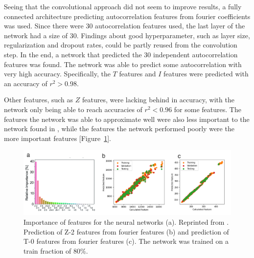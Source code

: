 Seeing that the convolutional approach did not seem to improve results, a fully connected architecture predicting autocorrelation features from fourier coefficients 
was used.
Since there were 30 autocorrelation features used, the last layer of the network had a size of 30.
Findings about good hyperparameter, such as layer size, regularization and dropout rates, could be partly reused from the convolution step.
In the end, a network that predicted the 30 independent autocorrelation features was found.
The network was able to predict some autocorrelation with very high accuracy. Specifically, the $T$ features and $I$ features were
predicted with an accuracy of $r^2 > 0.98$. 

Other features, such as $Z$ features, were lacking behind in accuracy, with the network only being able to reach accuracies of $r^2<0.96$ for some features.
The features the network was able to approximate well were also less important to the network found in \cite{friederich_dos}, while the features 
the network performed poorly were the more important features [Figure~\ref{fig:transfer_result}].

\begin{figure}[h]
    \includegraphics[width=1.0\textwidth]{figures/regression/fourier/transfer/transfer-learn.png}
    \caption[Prediction of autocorrelation features from LEFD]{
    Importance of features for the neural networks (a). Reprinted from \cite{friederich_dos}.
    Prediction of Z-2 features from fourier features (b) and prediction of T-0 features from fourier features (c). 
    The network was trained on a train fraction of 80\%.
    }
    \label{fig:transfer_result}
\end{figure}

